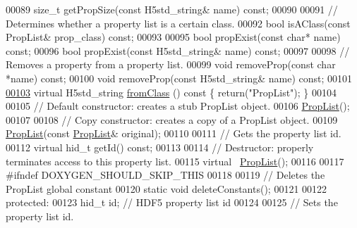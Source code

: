 \begin{DoxyCode}
00089         \textcolor{keywordtype}{size\_t} getPropSize(\textcolor{keyword}{const} H5std\_string& name) \textcolor{keyword}{const};
00090 
00091         \textcolor{comment}{// Determines whether a property list is a certain class.}
00092         \textcolor{keywordtype}{bool} isAClass(\textcolor{keyword}{const} PropList& prop\_class) \textcolor{keyword}{const};
00093 
00095         \textcolor{keywordtype}{bool} propExist(\textcolor{keyword}{const} \textcolor{keywordtype}{char}* name) \textcolor{keyword}{const};
00096         \textcolor{keywordtype}{bool} propExist(\textcolor{keyword}{const} H5std\_string& name) \textcolor{keyword}{const};
00097 
00098         \textcolor{comment}{// Removes a property from a property list.}
00099         \textcolor{keywordtype}{void} removeProp(\textcolor{keyword}{const} \textcolor{keywordtype}{char} *name) \textcolor{keyword}{const};
00100         \textcolor{keywordtype}{void} removeProp(\textcolor{keyword}{const} H5std\_string& name) \textcolor{keyword}{const};
00101 
\hyperlink{class_h5_1_1_prop_list_a090ada6d21725f711f017b5457383077}{00103}         \textcolor{keyword}{virtual} H5std\_string \hyperlink{class_h5_1_1_prop_list_a090ada6d21725f711f017b5457383077}{fromClass} ()\textcolor{keyword}{ const }\{ \textcolor{keywordflow}{return}(\textcolor{stringliteral}{"PropList"}); \}
00104 
00105         \textcolor{comment}{// Default constructor: creates a stub PropList object.}
00106         \hyperlink{class_h5_1_1_prop_list}{PropList}();
00107 
00108         \textcolor{comment}{// Copy constructor: creates a copy of a PropList object.}
00109         \hyperlink{class_h5_1_1_prop_list}{PropList}(\textcolor{keyword}{const} \hyperlink{class_h5_1_1_prop_list}{PropList}& original);
00110 
00111         \textcolor{comment}{// Gets the property list id.}
00112         \textcolor{keyword}{virtual} hid\_t getId() \textcolor{keyword}{const};
00113 
00114         \textcolor{comment}{// Destructor: properly terminates access to this property list.}
00115         \textcolor{keyword}{virtual} ~\hyperlink{class_h5_1_1_prop_list}{PropList}();
00116 
00117 \textcolor{preprocessor}{#ifndef DOXYGEN\_SHOULD\_SKIP\_THIS}
00118 
00119         \textcolor{comment}{// Deletes the PropList global constant}
00120         \textcolor{keyword}{static} \textcolor{keywordtype}{void} deleteConstants();
00121 
00122     \textcolor{keyword}{protected}:
00123         hid\_t id;    \textcolor{comment}{// HDF5 property list id}
00124 
00125         \textcolor{comment}{// Sets the property list id.}

\end{DoxyCode}
